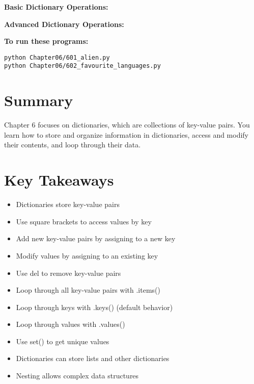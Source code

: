 \textbf{Basic Dictionary Operations:}


\textbf{Advanced Dictionary Operations:}


\textbf{To run these programs:}
\begin{verbatim}
python Chapter06/601_alien.py
python Chapter06/602_favourite_languages.py
\end{verbatim}

\section*{Summary}
Chapter 6 focuses on dictionaries, which are collections of key-value pairs. You learn how to store and organize information in dictionaries, access and modify their contents, and loop through their data.

\section*{Key Takeaways}
\begin{itemize}
    \item Dictionaries store key-value pairs
    \item Use square brackets to access values by key
    \item Add new key-value pairs by assigning to a new key
    \item Modify values by assigning to an existing key
    \item Use del to remove key-value pairs
    \item Loop through all key-value pairs with .items()
    \item Loop through keys with .keys() (default behavior)
    \item Loop through values with .values()
    \item Use set() to get unique values
    \item Dictionaries can store lists and other dictionaries
    \item Nesting allows complex data structures
\end{itemize} 